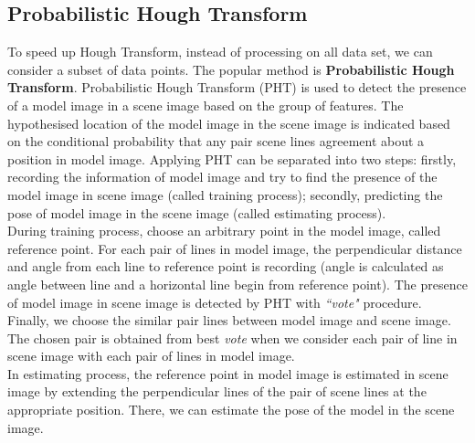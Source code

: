 \subsection{Probabilistic Hough Transform}
To speed up Hough Transform, instead of processing on all data set, we can consider a subset of data points. The popular method is  \textbf{Probabilistic Hough Transform}. Probabilistic Hough Transform (PHT) is used to detect the presence of a model image in a scene image based on the group of features. The hypothesised location of the model image in the scene image is indicated based on the conditional probability that any pair scene lines agreement about a position in model image. Applying PHT can be separated into two steps: firstly, recording the information of model image and try to find the presence of the model image in scene image (called training process); secondly, predicting the pose of model image in the scene image (called estimating process).\\[0.2cm]
During training process, choose an arbitrary point in the model image, called reference point. For each pair of lines in model image, the perpendicular distance and angle from each line to reference point is recording (angle is calculated as angle between line and a horizontal line begin from reference point). The presence of model image in scene image is detected by PHT with \textit{``vote"} procedure. Finally, we choose the similar pair lines between model image and scene image. The chosen pair is obtained from best \textit{vote} when we consider each pair of line in scene image with each pair of lines in model image.\\[0.2cm]
In estimating process, the reference point in model image is estimated in scene image by extending the perpendicular lines of the pair of scene lines at the appropriate position. There, we can estimate the pose of the model in the scene image.

